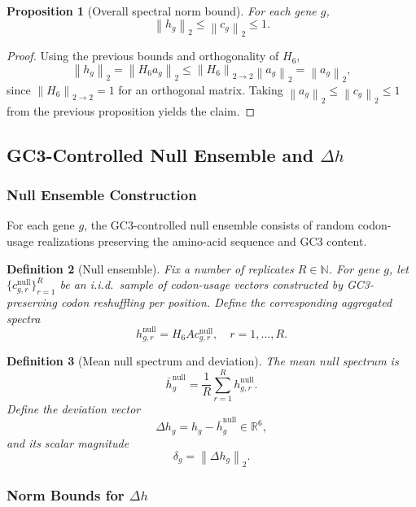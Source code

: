 \documentclass[11pt]{article}
\newtheorem{definition}{Definition}[section]
\newtheorem{proposition}[definition]{Proposition}
\newcommand{\N}{\mathbb{N}}
\newcommand{\R}{\mathbb{R}}
\newcommand{\norm}[1]{\left\lVert #1 \right\rVert}
\begin{document}
\begin{proposition}[Overall spectral norm bound]
For each gene \(g\),
\[
  \norm{h_g}_2 \le \norm{c_g}_2 \le 1.
\]
\end{proposition}

\begin{proof}
Using the previous bounds and orthogonality of \(H_6\),
\[
  \norm{h_g}_2 = \norm{H_6 a_g}_2 \le \norm{H_6}_{2\to2} \norm{a_g}_2 = \norm{a_g}_2,
\]
since \(\norm{H_6}_{2\to2} = 1\) for an orthogonal matrix.
Taking \(\norm{a_g}_2 \le \norm{c_g}_2 \le 1\) from the previous proposition yields the claim.
\end{proof}

\subsection{GC3-Controlled Null Ensemble and \texorpdfstring{$\Delta h$}{Δh}}

\subsubsection{Null Ensemble Construction}

For each gene \(g\), the GC3-controlled null ensemble consists of random codon-usage realizations preserving the amino-acid sequence and GC3 content.

\begin{definition}[Null ensemble]
Fix a number of replicates \(R \in \N\). For gene \(g\), let \(\{c_{g,r}^{\mathrm{null}}\}_{r=1}^R\) be an i.i.d.\ sample of codon-usage vectors constructed by GC3-preserving codon reshuffling per position.
Define the corresponding aggregated spectra
\[
  h_{g,r}^{\mathrm{null}} = H_6 A c_{g,r}^{\mathrm{null}}, \quad r=1,\dots,R.
\]
\end{definition}

\begin{definition}[Mean null spectrum and deviation]
The mean null spectrum is
\[
  \bar{h}_g^{\mathrm{null}} = \frac{1}{R} \sum_{r=1}^R h_{g,r}^{\mathrm{null}}.
\]
Define the deviation vector
\[
  \Delta h_g = h_g - \bar{h}_g^{\mathrm{null}} \in \R^6,
\]
and its scalar magnitude
\[
  \delta_g = \norm{\Delta h_g}_2.
\]
\end{definition}

\subsubsection{Norm Bounds for \texorpdfstring{$\Delta h$}{Δh}}
\end{document}
